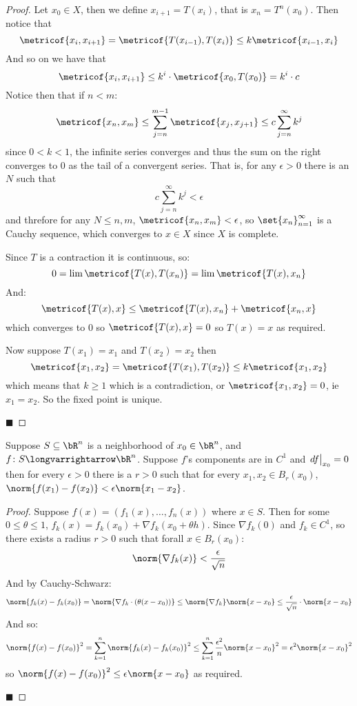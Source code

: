 \documentclass[10pt]{article}
\def\differ#1#2{\left.d#1\strut\right|_{#2}}
\begin{document}
\begin{proof}

    Let $x_0\in X$, then we define $x_{i+1}=T(x_i)$, that is $x_n=T^n(x_0)$.
    Then notice that
    \[ \metricof{x_i, x_{i+1}} = \metricof{T(x_{i-1}), T(x_i)} \leq k\metricof{x_{i-1}, x_i} \]
    And so on we have that
    \[ \metricof{x_i, x_{i+1}} \leq k^i\cdot\metricof{x_0, T(x_0)} = k^i\cdot c \]
    Notice then that if $n<m$:
    \[ \metricof{x_n, x_m} \leq \sum_{j=n}^{m-1} \metricof{x_j, x_{j+1}} \leq c\sum_{j=n}^\infty k^j \]
    since $0<k<1$, the infinite series converges and thus the sum on the right converges to $0$ as the tail of a convergent series.
    That is, for any $\epsilon>0$ there is an $N$ such that
    \[ c\sum_{j=n}^\infty k^j < \epsilon \]
    and threfore for any $N\leq n,m$, $\metricof{x_n,x_m}<\epsilon$, so $\set{x_n}_{n=1}^\infty$ is a Cauchy sequence, which converges to $x\in X$ since $X$ is complete.

    Since $T$ is a contraction it is continuous, so:
    \[ 0 = \lim\metricof{T(x), T(x_n)} = \lim\metricof{T(x), x_n} \]
    And:
    \[ \metricof{T(x), x} \leq \metricof{T(x), x_n} + \metricof{x_n, x} \]
    which converges to $0$ so $\metricof{T(x),x}=0$ so $T(x)=x$ as required.

    Now suppose $T(x_1)=x_1$ and $T(x_2)=x_2$ then
    \[ \metricof{x_1,x_2} = \metricof{T(x_1), T(x_2)} \leq k\metricof{x_1,x_2} \]
    which means that $k\geq1$ which is a contradiction, or $\metricof{x_1,x_2}=0$, ie $x_1=x_2$.
    So the fixed point is unique.

    \hfill$\blacksquare$

\end{proof}

\begin{lemm*}

    Suppose $S\subseteq\bR^n$ is a neighborhood of $x_0\in\bR^n$, and $f\colon S\longvarrightarrow\bR^n$.
    Suppose $f$'s components are in $C^1$ and $\differ f{x_0}=0$ then for every $\epsilon>0$ there is a $r>0$ such that for every $x_1,x_2\in B_r(x_0)$, $\norm{f(x_1)-f(x_2)}<\epsilon\norm{x_1-x_2}$.

\end{lemm*}

\begin{proof}

    Suppose $f(x)=(f_1(x),\dots,f_n(x))$ where $x\in S$.
    Then for some $0\leq\theta\leq1$, $f_k(x)=f_k(x_0)+\nabla f_k(x_0+\theta h)$.
    Since $\nabla f_k(0)$ and $f_k\in C^1$, so there exists a radius $r>0$ such that forall $x\in B_r(x_0)$:
    \[ \norm{\nabla f_k(x)}<\frac\epsilon{\sqrt n} \]
    And by Cauchy-Schwarz:
    \[ \norm{f_k(x)-f_k(x_0)} = \norm{\nabla f_k\cdot(\theta(x-x_0))} \leq \norm{\nabla f_k}\norm{x-x_0} \leq \frac\epsilon{\sqrt n}\cdot\norm{x-x_0} \]
    And so:
    \[ \norm{f(x)-f(x_0)}^2 = \sum_{k=1}^n\norm{f_k(x)-f_k(x_0)}^2 \leq \sum_{k=1}^n\frac{\epsilon^2}n\norm{x-x_0}^2 = \epsilon^2\norm{x-x_0}^2 \]
    so $\norm{f(x)-f(x_0)}^2\leq\epsilon\norm{x-x_0}$ as required.

    \hfill$\blacksquare$

\end{proof}
\end{document}
